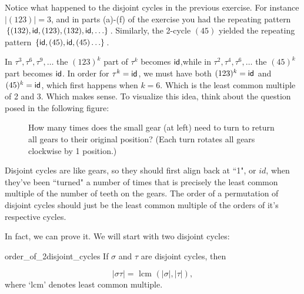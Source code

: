 \noindent
Notice what happened to the disjoint cycles in the previous exercise.  For instance $|(1 2 3)| = 3$, and in parts (a)-(f) of the exercise you had the repeating pattern $\{(1 3 2), {\sf{i}d}, (1 2 3), (1 3 2), {\sf{i}d}, \ldots\}$.  Similarly, the 2-cycle $(4 5)$ yielded the repeating pattern  $\{{\sf{i}d}, (4 5), {\sf{i}d}, (4 5) \ldots \}$.  

In $\tau^3, \tau^6, \tau^9, \ldots$  the $(1 2 3)^k$ part of $\tau^k$ becomes ${\sf{i}d} $,while in  $\tau^2, \tau^4, \tau^6, \ldots$ the $(4 5)^k$ part  becomes ${\sf{i}d} $.  In order for $\tau^k = {\sf{i}d} $, we must have both $(1 2 3)^k = {\sf{i}d} $ and $(4 5)^k = {\sf{i}d} $, which first happens when $k = 6$. Which is the least common multiple of 2 and 3.  Which makes sense.  To visualize this idea, think about the question posed in the following figure:

\begin{figure}[htb]
	  \caption{\label{fig:wheels:2} How many times does the small gear (at left) need to turn to return all gears to their original position? (Each turn rotates all  gears clockwise by 1 position.)}
\end{figure}

Disjoint cycles are like gears, so they should first align back at ``1", or $id$, when they've been ``turned" a number of times that is precisely the least common multiple of the number of teeth on the gears.  The order of a permutation of disjoint cycles should just be the least common multiple of the orders of it's respective cycles.  

In fact,  we can prove it.  We will start with two disjoint cycles:

\begin{prop}{order_of_2disjoint_cycles}
If $\sigma$ and $\tau$ are disjoint cycles, then 

$$|\sigma \tau| = \mbox{ lcm }(|\sigma|,|\tau|),$$
where `lcm' denotes least common multiple.
\end{prop}

